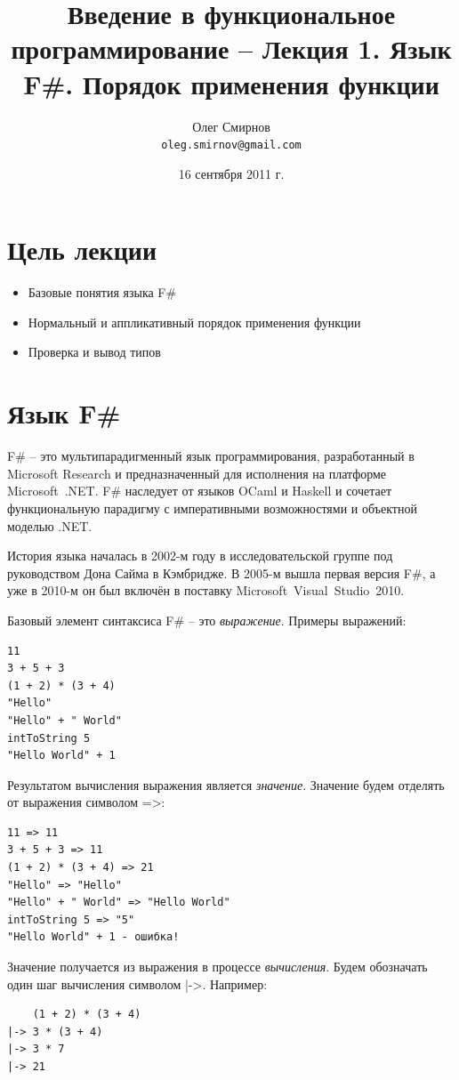 \documentclass[a4paper,11pt]{article}
\author{Олег Смирнов\\
\texttt{oleg.smirnov@gmail.com}}
\date{16 сентября 2011 г.}
\title{Введение в функциональное программирование -- Лекция 1. Язык F\#.
Порядок применения функции}
\begin{document}
\maketitle
\tableofcontents
\newpage

\section*{Цель лекции}
\begin{itemize}
\item Базовые понятия языка F\#
\item Нормальный и аппликативный порядок применения функции
\item Проверка и вывод типов
\end{itemize}

\section{Язык F\#}

F\# -- это мультипарадигменный язык программирования, разработанный в Microsoft
Research и предназначенный для исполнения на платформе Microsoft~.NET. F\#
наследует от языков OCaml и Haskell и сочетает функциональную парадигму с
императивными возможностями и объектной моделью .NET.

История языка началась в 2002-м году в исследовательской группе под руководством
Дона Сайма в Кэмбридже. В 2005-м вышла первая версия F\#, а уже в 2010-м он был
включён в поставку Microsoft~Visual~Studio~2010.

Базовый элемент синтаксиса F\# -- это \emph{выражение}. Примеры выражений:
\begin{lstlisting}
11
3 + 5 + 3
(1 + 2) * (3 + 4)
"Hello"
"Hello" + " World"
intToString 5
"Hello World" + 1
\end{lstlisting}

Результатом вычисления выражения является \emph{значение}. Значение будем
отделять от выражения символом =>:
\begin{lstlisting}
11 => 11
3 + 5 + 3 => 11
(1 + 2) * (3 + 4) => 21
"Hello" => "Hello"
"Hello" + " World" => "Hello World"
intToString 5 => "5"
"Hello World" + 1 - ошибка!
\end{lstlisting}

Значение получается из выражения в процессе \emph{вычисления}. Будем обозначать
один шаг вычисления символом |->. Например:
\begin{lstlisting}
    (1 + 2) * (3 + 4)
|-> 3 * (3 + 4)
|-> 3 * 7
|-> 21
\end{lstlisting}
\end{document}
